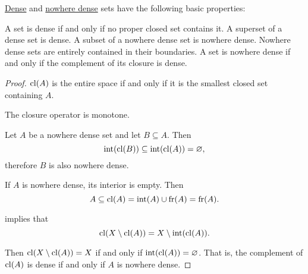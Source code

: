 \begin{proposition}\label{thm:def:topologically_dense_set}
  \hyperref[def:topologically_dense_set]{Dense} and \hyperref[def:topologically_dense_set]{nowhere dense} sets have the following basic properties:
  \begin{thmenum}
     A set is dense if and only if no proper closed set contains it.
     A superset of a dense set is dense.
     A subset of a nowhere dense set is nowhere dense.
     Nowhere dense sets are entirely contained in their boundaries.
     A set is nowhere dense if and only if the complement of its closure is dense.
  \end{thmenum}
\end{proposition}
\begin{proof}
   \( \operatorname{cl}(A) \) is the entire space if and only if it is the smallest closed set containing \( A \).

   The closure operator is monotone.

   Let \( A \) be a nowhere dense set and let \( B \subseteq A \). Then
  \begin{equation*}
    \operatorname{int}(\operatorname{cl}(B))
    \subseteq
    \operatorname{int}(\operatorname{cl}(A))
    =
    \varnothing,
  \end{equation*}
  therefore \( B \) is also nowhere dense.

   If \( A \) is nowhere dense, its interior is empty. Then
  \begin{equation*}
    A \subseteq \operatorname{cl}(A) = \operatorname{int}(A) \cup \operatorname{fr}(A) = \operatorname{fr}(A).
  \end{equation*}

    implies that
  \begin{equation*}
    \operatorname{cl}(X \setminus \operatorname{cl}(A)) = X \setminus \operatorname{int}(\operatorname{cl}(A)).
  \end{equation*}

  Then \( \operatorname{cl}(X \setminus \operatorname{cl}(A)) = X \) if and only if \( \operatorname{int}(\operatorname{cl}(A)) = \varnothing \). That is, the complement of \( \operatorname{cl}(A) \) is dense if and only if \( A \) is nowhere dense.
\end{proof}

